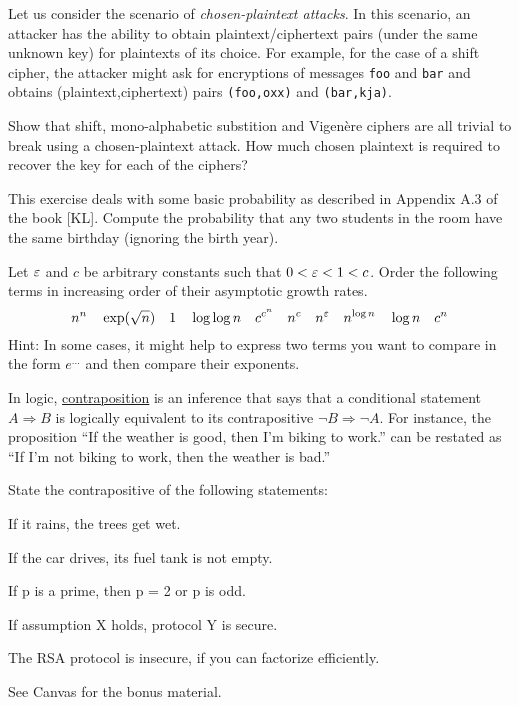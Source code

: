 \documentclass[a4paper,10pt,landscape,twocolumn]{scrartcl}
\begin{document}
\begin{exercise}
Let us consider the scenario of \emph{chosen-plaintext attacks}. In this scenario, an attacker has the ability to obtain plaintext/ciphertext pairs (under the same unknown key) for plaintexts of its choice. For example, for the case of a shift cipher, the attacker might ask for encryptions of messages \texttt{foo} and \texttt{bar} and obtains (plaintext,ciphertext) pairs \texttt{(foo,oxx)} and \texttt{(bar,kja)}.

Show that shift, mono-alphabetic substition and Vigen{\`e}re ciphers are all trivial to break using a chosen-plaintext attack. How much chosen plaintext is required to recover the key for each of the ciphers?
\end{exercise}


\begin{exercise}
This exercise deals with some basic probability as described in Appendix A.3 of the book [KL]. Compute the probability that any two students in the room have the same birthday (ignoring the birth year).
\end{exercise}


\begin{exercise}
Let $\varepsilon$ and $c$ be arbitrary constants such that $0<\varepsilon<1<c$. Order the following terms in increasing order of their
  asymptotic growth rates.
\[ n^n \quad \exp(\sqrt{n}) \quad 1 \quad \log\log n \quad
c^{c^n} \quad n^c \quad n^\varepsilon \quad n^{\log n} \quad \log n \quad c^n
\]
{\small Hint: In some cases, it might help to express two terms you
  want to compare in the form $e^{\ldots}$ and then compare their exponents.}
\end{exercise}


\begin{exercise}
In logic, \href{https://en.wikipedia.org/wiki/Contraposition}{contraposition} is an inference that says that a conditional statement $A \Rightarrow B$ is logically equivalent to its contrapositive $\neg B \Rightarrow \neg A$. For instance, the proposition ``If the weather is good, then I'm biking to work.'' can be restated as ``If I'm not biking to work, then the weather is bad.''

State the contrapositive of the following statements:
\begin{subex}
If it rains, the trees get wet.
\end{subex}
\begin{subex}
If the car drives, its fuel tank is not empty.
\end{subex}
\begin{subex}
If p is a prime, then p = 2 or p is odd.
\end{subex}
\begin{subex}
If assumption X holds, protocol Y is secure.
\end{subex}
\begin{subex}
The RSA protocol is insecure, if you can factorize efficiently.
\end{subex}
\end{exercise}

\begin{exercise}
See Canvas for the bonus material.
\end{exercise}
\end{document}
